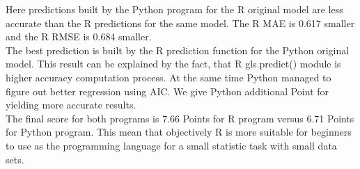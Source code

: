 \documentclass{article}
\begin{document}
Here predictions built by the Python program for the R original model are less accurate than the R predictions for the same model. The R MAE is 0.617 smaller and the R RMSE is 0.684 smaller.\\
The best prediction is built by the R prediction function for the Python original model. This result can be explained by the fact, that R gls.predict() module is higher accuracy computation process. At the same time Python managed to figure out better regression using AIC. We give Python additional Point for yielding more accurate results.\\
The final score for both programs is 7.66 Points for R program versus 6.71 Points for Python program. This mean that objectively R is more suitable for beginners to use as the programming language for a small statistic task with small data sets.
\end{document}
